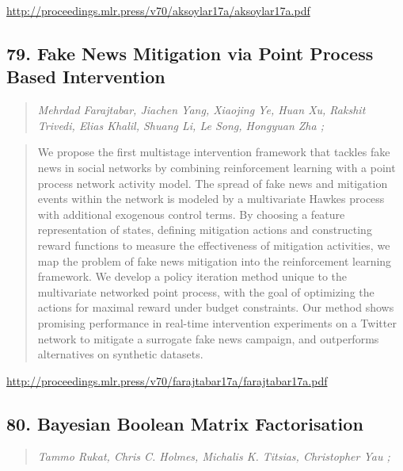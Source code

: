 \documentclass{article}
\begin{document}
\href{http://proceedings.mlr.press/v70/aksoylar17a/aksoylar17a.pdf}{http://proceedings.mlr.press/v70/aksoylar17a/aksoylar17a.pdf}

\subsection{79. Fake News Mitigation via Point Process Based Intervention}

\begin{quote}
\footnotesize{\textit{Mehrdad Farajtabar, Jiachen Yang, Xiaojing Ye, Huan Xu, Rakshit Trivedi, Elias Khalil, Shuang Li, Le Song, Hongyuan Zha ;}}
\end{quote}

\begin{quote}
    We propose the first multistage intervention framework that tackles fake news in social networks by combining reinforcement learning with a point process network activity model. The spread of fake news and mitigation events within the network is modeled by a multivariate Hawkes process with additional exogenous control terms. By choosing a feature representation of states, defining mitigation actions and constructing reward functions to measure the effectiveness of mitigation activities, we map the problem of fake news mitigation into the reinforcement learning framework. We develop a policy iteration method unique to the multivariate networked point process, with the goal of optimizing the actions for maximal reward under budget constraints. Our method shows promising performance in real-time intervention experiments on a Twitter network to mitigate a surrogate fake news campaign, and outperforms alternatives on synthetic datasets.  \end{quote}

\href{http://proceedings.mlr.press/v70/farajtabar17a/farajtabar17a.pdf}{http://proceedings.mlr.press/v70/farajtabar17a/farajtabar17a.pdf}

\subsection{80. Bayesian Boolean Matrix Factorisation}

\begin{quote}
\footnotesize{\textit{Tammo Rukat, Chris C. Holmes, Michalis K. Titsias, Christopher Yau ;}}
\end{quote}
\end{document}
